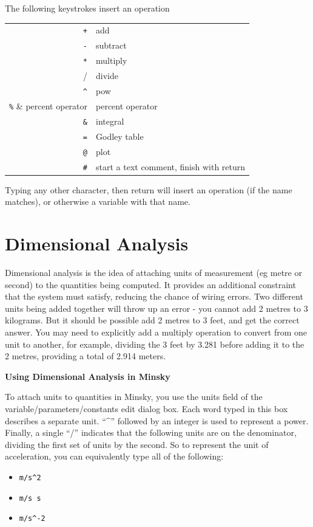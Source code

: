 The following keystrokes insert an operation

\begin{tabular}{rl}
  \verb-+- & add\\
  \verb+-+ & subtract \\
  \verb+*+ & multiply\\
  \verb++/ & divide\\
  \verb+^+ & pow\\
  \verb+%+ & percent operator\\
  \verb+&+ & integral\\
  \verb+=+ & Godley table\\
  \verb+@+ & plot\\
  \verb+#+ & start a text comment, finish with return\\
\end{tabular}

Typing any other character, then return will insert an operation (if
the name matches), or otherwise a variable with that name.

\section{Dimensional Analysis}

Dimensional analysis is the idea of attaching units of measurement (eg
metre or second) to the quantities being computed. It provides an
additional constraint that the system must satisfy, reducing the
chance of wiring errors. Two different units being added together will
throw up an error - you cannot add 2 metres to 3 kilograms. But it
should be possible add 2 metres to 3 feet, and get the correct
answer. You may need to explicitly add a multiply operation to convert
from one unit to another, for example, dividing the 3 feet by 3.281
before adding it to the 2 metres, providing a total of 2.914 meters.

\textbf{Using Dimensional Analysis in Minsky}

To attach units to quantities in Minsky, you use the units field of
the variable/parameters/constants edit dialog box. Each word typed in
this box describes a separate unit. ``\^{}'' followed by an integer is
used to represent a power. Finally, a single ``/'' indicates that the
following units are on the denominator, dividing the first set of
units by the second. So to represent the unit of acceleration, you can
equivalently type all of the following:

\begin{itemize}
\item \verb+m/s^2+
\item \verb+m/s s+
\item \verb+m/s^-2+
\end{itemize}

